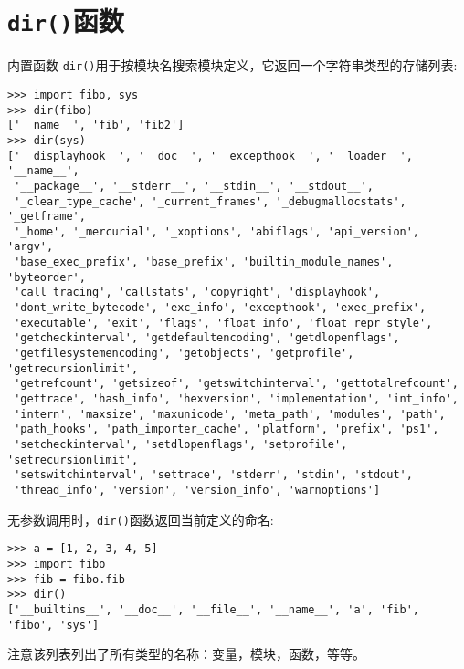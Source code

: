 \section{\texttt{dir()}函数}
内置函数 \texttt{dir()}用于按模块名搜索模块定义，它返回一个字符串类型的存储列表:
\begin{lstlisting}
>>> import fibo, sys
>>> dir(fibo)
['__name__', 'fib', 'fib2']
>>> dir(sys)
['__displayhook__', '__doc__', '__excepthook__', '__loader__', '__name__',
 '__package__', '__stderr__', '__stdin__', '__stdout__',
 '_clear_type_cache', '_current_frames', '_debugmallocstats', '_getframe',
 '_home', '_mercurial', '_xoptions', 'abiflags', 'api_version', 'argv',
 'base_exec_prefix', 'base_prefix', 'builtin_module_names', 'byteorder',
 'call_tracing', 'callstats', 'copyright', 'displayhook',
 'dont_write_bytecode', 'exc_info', 'excepthook', 'exec_prefix',
 'executable', 'exit', 'flags', 'float_info', 'float_repr_style',
 'getcheckinterval', 'getdefaultencoding', 'getdlopenflags',
 'getfilesystemencoding', 'getobjects', 'getprofile', 'getrecursionlimit',
 'getrefcount', 'getsizeof', 'getswitchinterval', 'gettotalrefcount',
 'gettrace', 'hash_info', 'hexversion', 'implementation', 'int_info',
 'intern', 'maxsize', 'maxunicode', 'meta_path', 'modules', 'path',
 'path_hooks', 'path_importer_cache', 'platform', 'prefix', 'ps1',
 'setcheckinterval', 'setdlopenflags', 'setprofile', 'setrecursionlimit',
 'setswitchinterval', 'settrace', 'stderr', 'stdin', 'stdout',
 'thread_info', 'version', 'version_info', 'warnoptions']
\end{lstlisting}
无参数调用时，\texttt{dir()}函数返回当前定义的命名:
\begin{lstlisting}
>>> a = [1, 2, 3, 4, 5]
>>> import fibo
>>> fib = fibo.fib
>>> dir()
['__builtins__', '__doc__', '__file__', '__name__', 'a', 'fib', 'fibo', 'sys']
\end{lstlisting}
注意该列表列出了所有类型的名称：变量，模块，函数，等等。

